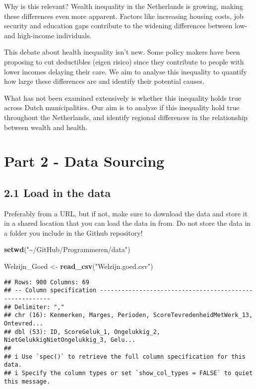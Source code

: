 \documentclass[
]{article}
\newenvironment{Shaded}{\begin{snugshade}}{\end{snugshade}}
\newcommand{\FunctionTok}[1]{\textcolor[rgb]{0.13,0.29,0.53}{\textbf{#1}}}
\newcommand{\NormalTok}[1]{#1}
\newcommand{\OtherTok}[1]{\textcolor[rgb]{0.56,0.35,0.01}{#1}}
\newcommand{\StringTok}[1]{\textcolor[rgb]{0.31,0.60,0.02}{#1}}
\begin{document}
Why is this relevant? Wealth inequality in the Netherlands is growing,
making these differences even more apparent. Factors like increasing
housing costs, job security and education gaps contribute to the
widening differences between low- and high-income individuals.

This debate about health inequality isn't new. Some policy makers have
been proposing to cut deductibles (eigen risico) since they contribute
to people with lower incomes delaying their care. We aim to analyse this
inequality to quantify how large these differences are and identify
their potential causes.

What has not been examined extensively is whether this inequality holds
true across Dutch municipalities. Our aim is to analyse if this
inequality hold true throughout the Netherlands, and identify regional
differences in the relationship between wealth and health.

\section{Part 2 - Data Sourcing}\label{part-2---data-sourcing}

\subsection{2.1 Load in the data}\label{load-in-the-data}

Preferably from a URL, but if not, make sure to download the data and
store it in a shared location that you can load the data in from. Do not
store the data in a folder you include in the Github repository!

\begin{Shaded}
\begin{Highlighting}[]
\FunctionTok{setwd}\NormalTok{(}\StringTok{"\textasciitilde{}/GitHub/Programmeren/data"}\NormalTok{)}

\NormalTok{Welzijn\_Goed }\OtherTok{\textless{}{-}} \FunctionTok{read\_csv}\NormalTok{(}\StringTok{"Welzijn.goed.csv"}\NormalTok{)}
\end{Highlighting}
\end{Shaded}

\begin{verbatim}
## Rows: 900 Columns: 69
## -- Column specification --------------------------------------------------------
## Delimiter: ","
## chr (16): Kenmerken, Marges, Perioden, ScoreTevredenheidMetWerk_13, Ontevred...
## dbl (53): ID, ScoreGeluk_1, Ongelukkig_2, NietGelukkigNietOngelukkig_3, Gelu...
## 
## i Use `spec()` to retrieve the full column specification for this data.
## i Specify the column types or set `show_col_types = FALSE` to quiet this message.
\end{verbatim}
\end{document}
